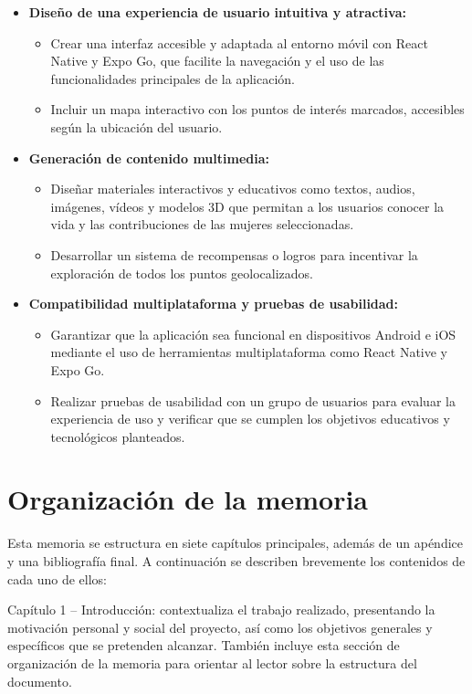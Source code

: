 \begin{itemize}
    \item \textbf{Diseño de una experiencia de usuario intuitiva y atractiva:}
    \begin{itemize}
        \item Crear una interfaz accesible y adaptada al entorno móvil con React Native y Expo Go, que facilite la navegación y el uso de las funcionalidades principales de la aplicación.
        \item Incluir un mapa interactivo con los puntos de interés marcados, accesibles según la ubicación del usuario.
    \end{itemize}

    \item \textbf{Generación de contenido multimedia:}
    \begin{itemize}
        \item Diseñar materiales interactivos y educativos como textos, audios, imágenes, vídeos y modelos 3D que permitan a los usuarios conocer la vida y las contribuciones de las mujeres seleccionadas.
        \item Desarrollar un sistema de recompensas o logros para incentivar la exploración de todos los puntos geolocalizados.
    \end{itemize}

    \item \textbf{Compatibilidad multiplataforma y pruebas de usabilidad:}
    \begin{itemize}
        \item Garantizar que la aplicación sea funcional en dispositivos Android e iOS mediante el uso de herramientas multiplataforma como React Native y Expo Go.
        \item Realizar pruebas de usabilidad con un grupo de usuarios para evaluar la experiencia de uso y verificar que se cumplen los objetivos educativos y tecnológicos planteados.
    \end{itemize}
\end{itemize}
    
\section{Organización de la memoria}
Esta memoria se estructura en siete capítulos principales, además de un apéndice y una bibliografía final. A continuación se describen brevemente los contenidos de cada uno de ellos:

Capítulo 1 – Introducción: contextualiza el trabajo realizado, presentando la motivación personal y social del proyecto, así como los objetivos generales y específicos que se pretenden alcanzar. También incluye esta sección de organización de la memoria para orientar al lector sobre la estructura del documento.

